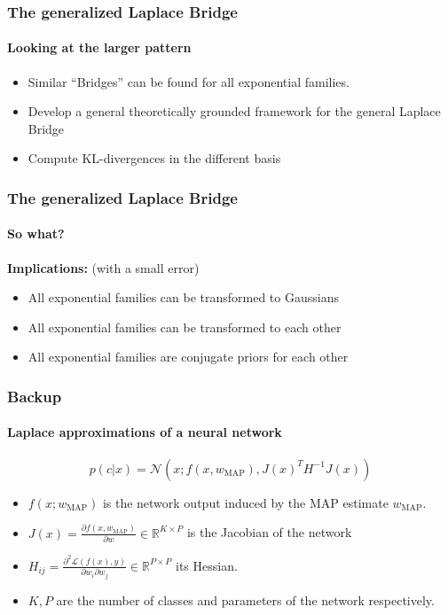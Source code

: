 \documentclass[10pt,usepdftitle=false,aspectratio=169,handout]{beamer}
\begin{document}



\begin{frame}\frametitle{The generalized Laplace Bridge}
	\framesubtitle{Looking at the larger pattern}
	\begin{itemize}
		\item Similar ``Bridges'' can be found for all exponential families.
		\item Develop a general theoretically grounded framework for the general Laplace Bridge
		\item Compute KL-divergences in the different basis
	\end{itemize}
\end{frame}


\begin{frame}\frametitle{The generalized Laplace Bridge}
	\framesubtitle{So what?}
	\textbf{Implications:} (with a small error)
	\begin{itemize}
		\item All exponential families can be transformed to Gaussians
		\item All exponential families can be transformed to each other
		\item All exponential families are conjugate priors for each other
	\end{itemize}
\end{frame}



\begin{frame}\frametitle{Backup}
	\framesubtitle{Laplace approximations of a neural network}
	\begin{equation}
	p(c | x) = \mathcal{N}(x; f(x,w_\text{MAP}), J(x)^T H^{-1} J(x))
	\label{eq:LANN}
	\end{equation}
	\begin{itemize}
		\item $f(x; w_\text{MAP})$ is the network output induced by the MAP estimate $w_\text{MAP}$.
		\item $J(x) = \frac{\partial f(x, w_{\text{MAP}})}{\partial w} \in \mathbb{R}^{K\times P}$ is the Jacobian of the network 
		\item $H_{ij} = \frac{\partial^2 \mathcal{L}(f(x), y)}{\partial w_i \partial w_j} \in \mathbb{R}^{P \times P}$ its Hessian. 
		\item $K, P$ are the number of classes and parameters of the network respectively.
	\end{itemize}
\end{frame}
\end{document}
